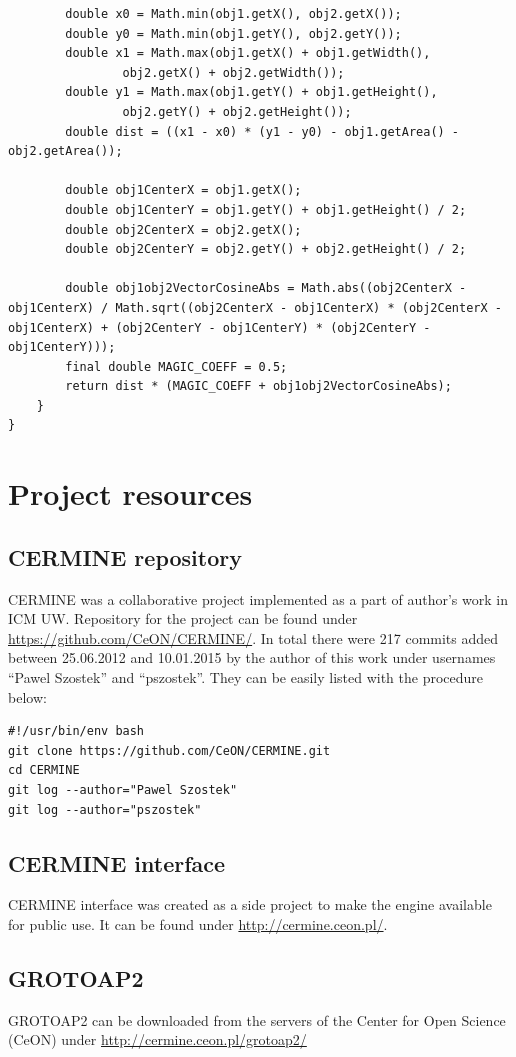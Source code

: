 \begin{appendix}
\begin{lstlisting}
        double x0 = Math.min(obj1.getX(), obj2.getX());
        double y0 = Math.min(obj1.getY(), obj2.getY());
        double x1 = Math.max(obj1.getX() + obj1.getWidth(),
                obj2.getX() + obj2.getWidth());
        double y1 = Math.max(obj1.getY() + obj1.getHeight(),
                obj2.getY() + obj2.getHeight());
        double dist = ((x1 - x0) * (y1 - y0) - obj1.getArea() - obj2.getArea());

        double obj1CenterX = obj1.getX();
        double obj1CenterY = obj1.getY() + obj1.getHeight() / 2;
        double obj2CenterX = obj2.getX();
        double obj2CenterY = obj2.getY() + obj2.getHeight() / 2;

        double obj1obj2VectorCosineAbs = Math.abs((obj2CenterX - obj1CenterX) / Math.sqrt((obj2CenterX - obj1CenterX) * (obj2CenterX - obj1CenterX) + (obj2CenterY - obj1CenterY) * (obj2CenterY - obj1CenterY)));
        final double MAGIC_COEFF = 0.5;
        return dist * (MAGIC_COEFF + obj1obj2VectorCosineAbs);
    }
}
\end{lstlisting}

\chapter{Project resources}
\label{app:resources}
\section{CERMINE repository}
CERMINE was a collaborative project implemented as a part of author's work in ICM UW. Repository for the project can be found under \url{https://github.com/CeON/CERMINE/}.
In total there were 217 commits added between 25.06.2012 and 10.01.2015 by the author of this work under usernames ``Pawel Szostek'' and ``pszostek''. They can be easily listed with the procedure below:
\begin{lstlisting}
#!/usr/bin/env bash
git clone https://github.com/CeON/CERMINE.git
cd CERMINE
git log --author="Pawel Szostek"
git log --author="pszostek"
\end{lstlisting}
\section{CERMINE interface}
CERMINE interface was created as a side project to make the engine available for public use. It can be found under \url{http://cermine.ceon.pl/}.
\section{GROTOAP2}
GROTOAP2 can be downloaded from the servers of the Center for Open Science (CeON) under \url{http://cermine.ceon.pl/grotoap2/}

\end{appendix}
